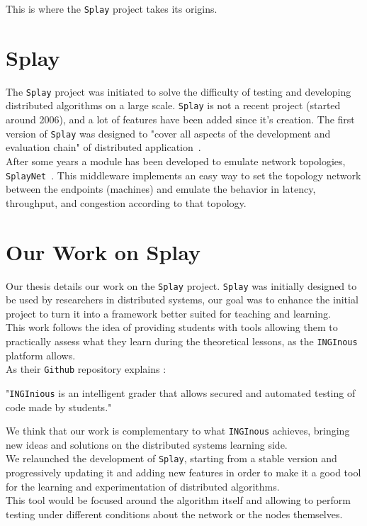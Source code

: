 \documentclass{eplmastersthesis}
\begin{document}
      This is where the \texttt{Splay} project takes its origins.

    \section{Splay}

      The \texttt{Splay} project was initiated to solve the difficulty of testing
      and developing distributed algorithms on a large scale. \texttt{Splay} is
      not a recent project (started around 2006), and a lot of features have been
      added since it's creation. The first version of \texttt{Splay} was
      designed to "cover all aspects of the development and evaluation
      chain" of distributed application~\cite{SPLAY}.\\
      After some years a module has been developed to emulate network
      topologies, \texttt{SplayNet}~\cite{SplayNet}. This middleware implements
      an easy way to set the topology network between the endpoints (machines)
      and emulate the behavior in latency, throughput, and congestion according
      to that topology.

    \section{Our Work on Splay}

      Our thesis details our work on the \texttt{Splay} project. \texttt{Splay}
      was initially designed to be used by researchers in distributed systems,
      our goal was to enhance the initial project to turn it into a framework
      better suited for teaching and learning.\\
      This work follows the idea of providing students with tools
      allowing them to practically assess what they learn during the
      theoretical lessons, as the \texttt{INGInous}~\cite{inginious} platform allows.\\
      As their \texttt{Github} repository explains :
      \begin{displayquote}
        "\texttt{INGInious} is an intelligent grader that allows secured and
        automated testing of code made by students."
      \end{displayquote}
      We think that our work is complementary to what \texttt{INGInous} achieves,
      bringing new ideas and solutions on the distributed systems learning
      side.\\

      We relaunched the development of \texttt{Splay}, starting from a stable
      version and progressively updating it and adding new
      features in order to make it a good tool for the learning and
      experimentation of distributed algorithms.\\
      This tool would be focused around the algorithm itself and allowing to
      perform testing under different conditions about the network or
      the nodes themselves.\\
\end{document}
